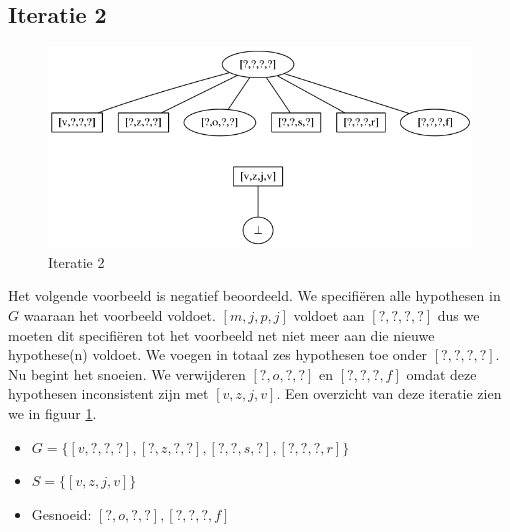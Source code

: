 \documentclass[alternative-exam.tex]{subfiles}
\begin{document}
\subsection{Iteratie 2}
\begin{figure}
[H]
\centering
\caption{Iteratie 2}
\label{iter_2}
\includegraphics[scale=0.5]{resources/graphs/iteration_2.png}
\end{figure}
Het volgende voorbeeld is negatief beoordeeld. We specifi\"eren alle hypothesen in $G$ waaraan het voorbeeld voldoet. $[m,j,p,j]$ voldoet aan $[?,?,?,?]$ dus we moeten dit specifi\"eren tot het voorbeeld net niet meer aan die nieuwe hypothese(n) voldoet. We voegen in totaal zes hypothesen toe onder $[?,?,?,?]$. Nu begint het snoeien. We verwijderen $[?,o,?,?]$ en $[?,?,?,f]$ omdat deze hypothesen inconsistent zijn met $[v,z,j,v]$. Een overzicht van deze iteratie zien we in figuur \ref{iter_2}.
\begin{itemize}
\item $G = \{[v,?,?,?],[?,z,?,?],[?,?,s,?],[?,?,?,r]\}$
\item $S = \{[v,z,j,v]\}$
\item Gesnoeid: $[?,o,?,?],[?,?,?,f]$
\end{itemize}
\end{document}
